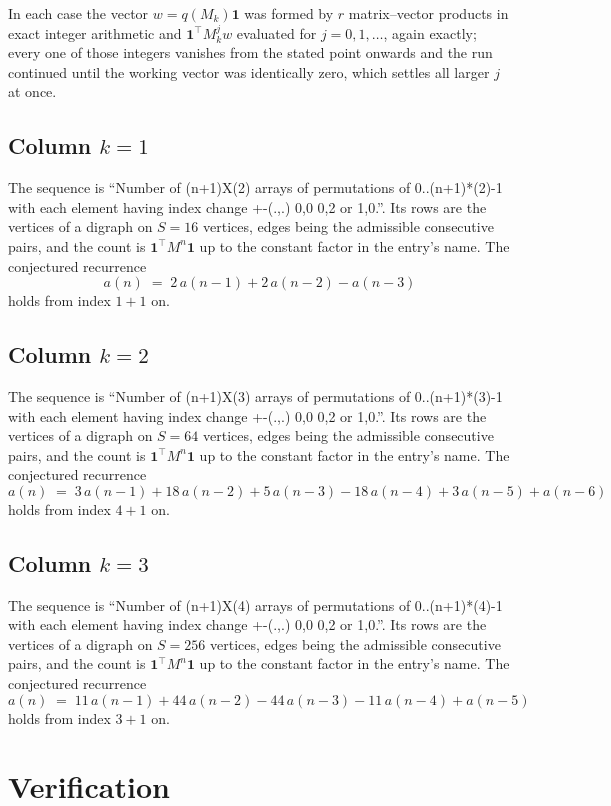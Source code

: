 \documentclass[11pt,a4paper]{article}
\theoremstyle{plain}
\theoremstyle{definition}
\begin{document}
In each case the vector $w=q(M_k)\mathbf{1}$ was formed by $r$ matrix--vector products in
exact integer arithmetic and $\mathbf{1}^{\!\top}M_k^{j}w$ evaluated for $j=0,1,\dots$,
again exactly; every one of those integers vanishes from the stated point onwards and the run
continued until the working vector was identically zero, which settles all larger $j$ at once.

\subsection*{Column $k$$=1$}
The sequence is ``Number of (n+1)X(2) arrays of permutations of 0..(n+1)*(2)-1 with each element having index change +-(.,.) 0,0 0,2 or 1,0.''. Its rows are the vertices of a digraph on
$S=16$ vertices, edges being the admissible consecutive pairs, and the count is
$\mathbf{1}^{\!\top}M^{n}\mathbf{1}$ up to the constant factor in the entry's name.
The conjectured recurrence
\[
a(n)\;=\;2\,a(n-1) + 2\,a(n-2) - a(n-3)
\]
holds from index $1+1$ on.

\subsection*{Column $k$$=2$}
The sequence is ``Number of (n+1)X(3) arrays of permutations of 0..(n+1)*(3)-1 with each element having index change +-(.,.) 0,0 0,2 or 1,0.''. Its rows are the vertices of a digraph on
$S=64$ vertices, edges being the admissible consecutive pairs, and the count is
$\mathbf{1}^{\!\top}M^{n}\mathbf{1}$ up to the constant factor in the entry's name.
The conjectured recurrence
\[
a(n)\;=\;3\,a(n-1) + 18\,a(n-2) + 5\,a(n-3) - 18\,a(n-4) + 3\,a(n-5) + a(n-6)
\]
holds from index $4+1$ on.

\subsection*{Column $k$$=3$}
The sequence is ``Number of (n+1)X(4) arrays of permutations of 0..(n+1)*(4)-1 with each element having index change +-(.,.) 0,0 0,2 or 1,0.''. Its rows are the vertices of a digraph on
$S=256$ vertices, edges being the admissible consecutive pairs, and the count is
$\mathbf{1}^{\!\top}M^{n}\mathbf{1}$ up to the constant factor in the entry's name.
The conjectured recurrence
\[
a(n)\;=\;11\,a(n-1) + 44\,a(n-2) - 44\,a(n-3) - 11\,a(n-4) + a(n-5)
\]
holds from index $3+1$ on.

\section{Verification}
\end{document}
